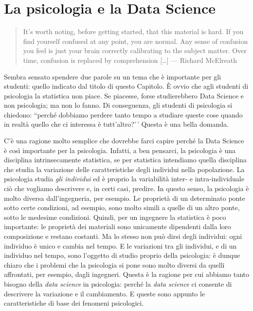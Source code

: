 \documentclass[
  11pt,
  italian,
  a4paper,
  extrafontsizes,onecolumn,openright
  ]{memoir}
\begin{document}
\hypertarget{la-psicologia-e-la-data-science}{%
\section*{La psicologia e la Data Science}\label{la-psicologia-e-la-data-science}}

\begin{quote}
It's worth noting, before getting started, that this material is hard. If you find yourself confused at any point, you are normal. Any sense of confusion you feel is just your brain correctly calibrating to the subject matter. Over time, confusion is replaced by comprehension {[}\ldots{]} --- Richard McElreath
\end{quote}

Sembra sensato spendere due parole su un tema che è importante per gli studenti: quello indicato dal titolo di questo Capitolo. È ovvio che agli studenti di psicologia la statistica non piace. Se piacesse, forse studierebbero Data Science e non psicologia; ma non lo fanno. Di conseguenza, gli studenti di psicologia si chiedono: ``perché dobbiamo perdere tanto tempo a studiare queste cose quando in realtà quello che ci interessa è tutt'altro?'\,' Questa è una bella domanda.

C'è una ragione molto semplice che dovrebbe farci capire perché la Data Science è così importante per la psicologia. Infatti, a ben pensarci, la psicologia è una disciplina intrinsecamente statistica, se per statistica intendiamo quella disciplina che studia la variazione delle caratteristiche degli individui nella popolazione. La psicologia studia \emph{gli individui} ed è proprio la variabilità inter- e intra-individuale ciò che vogliamo descrivere e, in certi casi, predire. In questo senso, la psicologia è molto diversa dall'ingegneria, per esempio. Le proprietà di un determinato ponte sotto certe condizioni, ad esempio, sono molto simili a quelle di un altro ponte, sotto le medesime condizioni. Quindi, per un ingegnere la statistica è poco importante: le proprietà dei materiali sono unicamente dipendenti dalla loro composizione e restano costanti. Ma lo stesso non può dirsi degli individui: ogni individuo è unico e cambia nel tempo. E le variazioni tra gli individui, e di un individuo nel tempo, sono l'oggetto di studio proprio della psicologia: è dunque chiaro che i problemi che la psicologia si pone sono molto diversi da quelli affrontati, per esempio, dagli ingegneri. Questa è la ragione per cui abbiamo tanto bisogno della \emph{data science} in psicologia: perché la \emph{data science} ci consente di descrivere la variazione e il cambiamento. E queste sono appunto le caratteristiche di base dei fenomeni psicologici.
\end{document}
